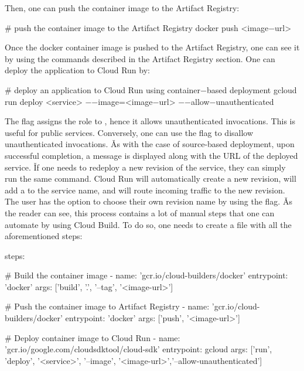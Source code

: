 Then, one can push the container image to the Artifact Registry:
\begin{bash}
# push the container image to the Artifact Registry
docker push <image$-$url>
\end{bash}

Once the docker container image is pushed to the Artifact Registry, one can see it by using the commands described
in the Artifact Registry section. One can deploy the application to Cloud Run by:
\begin{bash}
# deploy an application to Cloud Run using container$-$based deployment
gcloud run deploy <service> $-$$-$image=<image$-$url> $-$$-$allow$-$unauthenticated
\end{bash}

The  flag assigns the  role to , hence it
allows unauthenticated invocations. This is useful for public services. Conversely, one can use the flag
 to disallow unauthenticated invocations. \v

As with the case of source-based deployment, upon successful completion, a message is displayed along with the URL
of the deployed service. \v

If one needs to redeploy a new revision of the service, they can simply run the same command. Cloud Run will
automatically create a new revision, will add a  to the service name, and will route incoming
traffic to the new revision. The user has the option to choose their own revision name by using the
 flag. \v

As the reader can see, this process contains a lot of manual steps that one can automate by using Cloud Build. To do so,
one needs to create a  file with all the aforementioned steps:
\begin{block}
steps:

    $\#$ Build the container image
    - name: 'gcr.io/cloud-builders/docker'
      entrypoint: 'docker'
      args: ['build', '.', '--tag', '<image-url>']

    $\#$ Push the container image to Artifact Registry
    - name: 'gcr.io/cloud-builders/docker'
      entrypoint: 'docker'
      args: ['push', '<image-url>']

    $\#$ Deploy container image to Cloud Run
    - name: 'gcr.io/google.com/cloudsdktool/cloud-sdk'
      entrypoint: gcloud
      args: ['run', 'deploy', '<service>', '--image', '<image-url>','--allow-unauthenticated']
\end{block}

